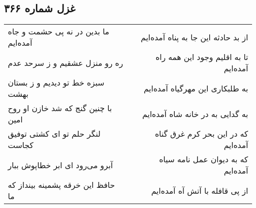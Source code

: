 \begin{center}
\section*{غزل شماره ۳۶۶}
\label{sec:sh366}
\begin{longtable}{l p{0.5cm} r}
ما بدین در نه پی حشمت و جاه آمده‌ایم
&&
از بد حادثه این جا به پناه آمده‌ایم
\\
ره رو منزل عشقیم و ز سرحد عدم
&&
تا به اقلیم وجود این همه راه آمده‌ایم
\\
سبزه خط تو دیدیم و ز بستان بهشت
&&
به طلبکاری این مهرگیاه آمده‌ایم
\\
با چنین گنج که شد خازن او روح امین
&&
به گدایی به در خانه شاه آمده‌ایم
\\
لنگر حلم تو ای کشتی توفیق کجاست
&&
که در این بحر کرم غرق گناه آمده‌ایم
\\
آبرو می‌رود ای ابر خطاپوش ببار
&&
که به دیوان عمل نامه سیاه آمده‌ایم
\\
حافظ این خرقه پشمینه بینداز که ما
&&
از پی قافله با آتش آه آمده‌ایم
\\
\end{longtable}
\end{center}
